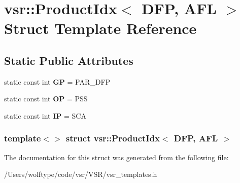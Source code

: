 \hypertarget{structvsr_1_1_product_idx_3_01_d_f_p_00_01_a_f_l_01_4}{\section{vsr\-:\-:Product\-Idx$<$ D\-F\-P, A\-F\-L $>$ Struct Template Reference}
\label{structvsr_1_1_product_idx_3_01_d_f_p_00_01_a_f_l_01_4}
}
\subsection*{Static Public Attributes}
\begin{DoxyCompactItemize}
\item 
\hypertarget{structvsr_1_1_product_idx_3_01_d_f_p_00_01_a_f_l_01_4_aab96e70286d9a2c4efc4a466ed226e6d}{static const int {\bfseries G\-P} = P\-A\-R\-\_\-\-D\-F\-P}\label{structvsr_1_1_product_idx_3_01_d_f_p_00_01_a_f_l_01_4_aab96e70286d9a2c4efc4a466ed226e6d}

\item 
\hypertarget{structvsr_1_1_product_idx_3_01_d_f_p_00_01_a_f_l_01_4_addfaaccb612773beda28ed3270482255}{static const int {\bfseries O\-P} = P\-S\-S}\label{structvsr_1_1_product_idx_3_01_d_f_p_00_01_a_f_l_01_4_addfaaccb612773beda28ed3270482255}

\item 
\hypertarget{structvsr_1_1_product_idx_3_01_d_f_p_00_01_a_f_l_01_4_a7190c54581ae33db184c426c066a2b94}{static const int {\bfseries I\-P} = S\-C\-A}\label{structvsr_1_1_product_idx_3_01_d_f_p_00_01_a_f_l_01_4_a7190c54581ae33db184c426c066a2b94}

\end{DoxyCompactItemize}
\subsubsection*{template$<$$>$ struct vsr\-::\-Product\-Idx$<$ D\-F\-P, A\-F\-L $>$}



The documentation for this struct was generated from the following file\-:\begin{DoxyCompactItemize}
\item 
/\-Users/wolftype/code/vsr/\-V\-S\-R/vsr\-\_\-templates.\-h\end{DoxyCompactItemize}
